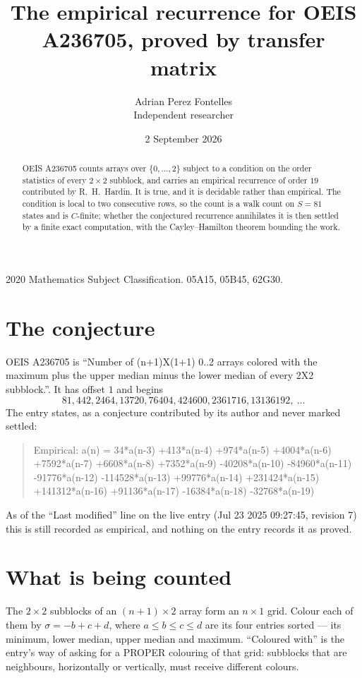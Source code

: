 \documentclass[11pt,a4paper]{article}
\title{The empirical recurrence for OEIS A236705, proved by transfer matrix}
\author{Adrian Perez Fontelles\\ \small Independent researcher}
\date{2 September 2026}
\theoremstyle{plain}
\theoremstyle{definition}
\begin{document}
\maketitle

\begin{abstract}
OEIS A236705 counts arrays over $\{0,\dots,2\}$ subject to a condition on the order
statistics of every $2\times2$ subblock, and carries an empirical recurrence of order
$19$ contributed by R.~H.~Hardin. It is true, and it is decidable rather than empirical.
The condition is local to two consecutive rows, so the count is a walk count on $S=81$
states and is $C$-finite; whether the conjectured recurrence annihilates it is then settled by
a finite exact computation, with the Cayley--Hamilton theorem bounding the work.
\end{abstract}

\noindent\small 2020 Mathematics Subject Classification. 05A15, 05B45, 62G30.\normalsize

\section{The conjecture}

OEIS A236705 is ``Number of (n+1)X(1+1) 0..2 arrays colored with the maximum plus the upper median minus the lower median of every 2X2 subblock.''. It has offset $1$ and begins
\[
81, 442, 2464, 13720, 76404, 424600, 2361716, 13136192,\ \dots
\]
The entry states, as a conjecture contributed by its author and never marked settled:
\begin{quote}
Empirical: a(n) = 34*a(n-3) +413*a(n-4) +974*a(n-5) +4004*a(n-6) +7592*a(n-7) +6608*a(n-8) +7352*a(n-9) -40208*a(n-10) -84960*a(n-11) -91776*a(n-12) -114528*a(n-13) +99776*a(n-14) +231424*a(n-15) +141312*a(n-16) +91136*a(n-17) -16384*a(n-18) -32768*a(n-19)
\end{quote}
As of the ``Last modified'' line on the live entry (Jul 23 2025 09:27:45, revision 7) this is still
recorded as empirical, and nothing on the entry records it as proved.

\section{What is being counted}

The $2\times2$ subblocks of an $(n+1)\times2$ array form an
$n\times1$ grid. Colour each of them by $\sigma=-b+c+d$, where $a\le b\le c\le d$ are its four entries sorted --- its minimum, lower median, upper median and maximum. ``Coloured with'' is the entry's way of
asking for a PROPER colouring of that grid: subblocks that are neighbours, horizontally or
vertically, must receive different colours.
\end{document}
